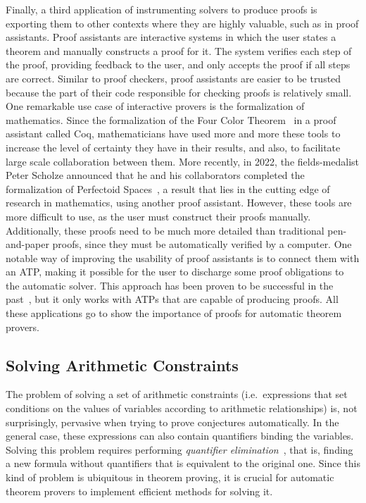 \documentclass[a4paper, 12pt]{article}
\begin{document}
Finally, a third application of instrumenting solvers to produce proofs is exporting them to
other contexts where they are highly valuable, such as in proof assistants.
%
Proof assistants are interactive systems in which the user states a theorem and manually constructs
a proof for it. The system verifies each step of the proof, providing feedback to the user, and only
accepts the proof if all steps are correct.
%
Similar to proof checkers, proof assistants are easier to be trusted because the part of their code
responsible for checking proofs is relatively small.
%
One remarkable use case of interactive provers is the formalization of mathematics.
Since the formalization of the Four Color Theorem~\cite{fctCoq} in a proof assistant called Coq,
mathematicians have used more and more these tools to increase the level of certainty
they have in their results, and also, to facilitate large scale collaboration between them.
More recently, in 2022, the fields-medalist Peter Scholze announced that he and his collaborators
completed the formalization of Perfectoid Spaces~\cite{scholze}, a result that lies in the
cutting edge of research in mathematics, using another proof assistant.
%
However, these tools are more difficult to use, as the user must construct their proofs
manually. Additionally, these proofs need to be much more detailed than traditional pen-and-paper proofs,
since they must be automatically verified by a computer.
%
One notable way of improving the usability of proof assistants is to connect them with an ATP,
making it possible for the user to discharge some proof obligations to the automatic solver.
This approach has been proven to be successful in the past~\cite{coq2, reconstruct}, but it
only works with ATPs that are capable of producing proofs.
%
All these applications go to show the importance of proofs for automatic theorem provers.


\subsection{Solving Arithmetic Constraints}

The problem of solving a set of arithmetic constraints (i.e.\ expressions that set conditions
on the values of variables according to arithmetic relationships) is,
not surprisingly, pervasive when trying to prove conjectures automatically. In the general case, these expressions
can also contain quantifiers binding the variables. Solving this problem requires
performing \textit{quantifier elimination}~\cite{mayeroQE}, that is, finding a new formula without quantifiers
that is equivalent to the original one. Since this kind of problem is ubiquitous in theorem
proving, it is crucial for automatic theorem provers to implement efficient methods for solving it.
\end{document}
